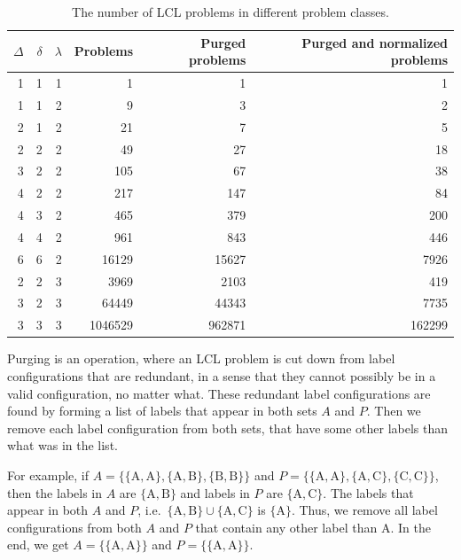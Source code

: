 \begin{table}[H]
  \centering
  \begin{tabular}{rrrrrr}
    \toprule
    $\Delta$ & $\delta$ & $\lambda$ & Problems & Purged problems & Purged and normalized problems\\
    \midrule
    1 & 1 & 1 & 1 & 1 & 1 \\
    \midrule
    1 & 1 & 2 & 9 & 3 & 2 \\
    2 & 1 & 2 & 21 & 7 & 5 \\
    2 & 2 & 2 & 49 & 27 & 18 \\
    3 & 2 & 2 & 105 & 67 & 38 \\
    4 & 2 & 2 & 217 & 147 & 84 \\
    4 & 3 & 2 & 465 & 379 & 200 \\
    4 & 4 & 2 & 961 & 843 & 446 \\
    6 & 6 & 2 & 16129 & 15627 & 7926 \\
    \midrule
    2 & 2 & 3 & 3969 & 2103 & 419 \\
    3 & 2 & 3 & 64449 & 44343 & 7735 \\
    3 & 3 & 3 & 1046529 & 962871 & 162299 \\
    \bottomrule
  \end{tabular}
  \caption{%
    The number of LCL problems in different problem classes.
  }
  \label{tbl:lcl_problem_classes}
\end{table}

Purging is an operation, where an LCL problem is cut down from label configurations that are redundant, in a sense that they cannot possibly be in a valid configuration, no matter what.
These redundant label configurations are found by forming a list of labels that appear in both sets $A$ and $P$.
Then we remove each label configuration from both sets, that have some other labels than what was in the list.

For example, if $A=\{\{\mathrm{A, A}\}, \{\mathrm{A, B}\}, \{\mathrm{B, B}\}\}$ and $P=\{\{\mathrm{A, A}\}, \{\mathrm{A, C}\}, \{\mathrm{C, C}\}\}$, then the labels in $A$ are $\{\mathrm{A, B}\}$ and labels in $P$ are $\{\mathrm{A, C}\}$.
The labels that appear in both $A$ and $P$, i.e.\ $\{\mathrm{A, B}\} \cup \{\mathrm{A, C}\} $ is $\{\mathrm{A}\}$.
Thus, we remove all label configurations from both $A$ and $P$ that contain any other label than $\mathrm{A}$.
In the end, we get $A=\{\{\mathrm{A, A}\}\}$ and $P=\{\{\mathrm{A, A}\}\}$.


